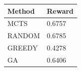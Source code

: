 \begin{tabular}{ll}
\hline
Method & Reward \\
\hline
  MCTS & 0.6757 \\
  RANDOM & 0.6785 \\
  GREEDY & 0.4278 \\
  GA & 0.6406 \\
\hline
\end{tabular}
